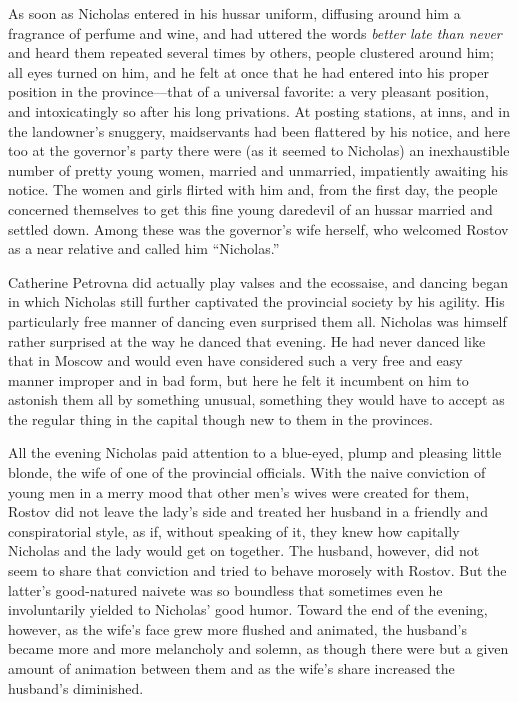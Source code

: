 As soon as Nicholas entered in his hussar uniform, diffusing
around him a fragrance of perfume and wine, and had uttered the
words \emph{better late than never} and heard them repeated
several times by others, people clustered around him; all eyes
turned on him, and he felt at once that he had entered into his
proper position in the province---that of a universal favorite: a
very pleasant position, and intoxicatingly so after his long
privations. At posting stations, at inns, and in the landowner's
snuggery, maidservants had been flattered by his notice, and here
too at the governor's party there were (as it seemed to Nicholas)
an inexhaustible number of pretty young women, married and
unmarried, impatiently awaiting his notice. The women and girls
flirted with him and, from the first day, the people concerned
themselves to get this fine young daredevil of an hussar married
and settled down. Among these was the governor's wife herself,
who welcomed Rostov as a near relative and called him
``Nicholas.''

Catherine Petrovna did actually play valses and the ecossaise,
and dancing began in which Nicholas still further captivated the
provincial society by his agility. His particularly free manner
of dancing even surprised them all. Nicholas was himself rather
surprised at the way he danced that evening. He had never danced
like that in Moscow and would even have considered such a very
free and easy manner improper and in bad form, but here he felt
it incumbent on him to astonish them all by something unusual,
something they would have to accept as the regular thing in the
capital though new to them in the provinces.

All the evening Nicholas paid attention to a blue-eyed, plump and
pleasing little blonde, the wife of one of the provincial
officials.  With the naive conviction of young men in a merry
mood that other men's wives were created for them, Rostov did not
leave the lady's side and treated her husband in a friendly and
conspiratorial style, as if, without speaking of it, they knew
how capitally Nicholas and the lady would get on together. The
husband, however, did not seem to share that conviction and tried
to behave morosely with Rostov. But the latter's good-natured
naivete was so boundless that sometimes even he involuntarily
yielded to Nicholas' good humor. Toward the end of the evening,
however, as the wife's face grew more flushed and animated, the
husband's became more and more melancholy and solemn, as though
there were but a given amount of animation between them and as
the wife's share increased the husband's diminished.

